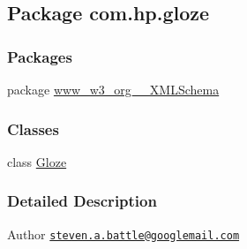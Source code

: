 \hypertarget{namespacecom_1_1hp_1_1gloze}{
\subsection{Package com.hp.gloze}
\label{namespacecom_1_1hp_1_1gloze}
}
\subsubsection*{Packages}
\begin{DoxyCompactItemize}
\item 
package \hyperlink{namespacecom_1_1hp_1_1gloze_1_1www__w3__org__2001___x_m_l_schema}{www\_\-w3\_\-org\_\_\-XMLSchema}
\end{DoxyCompactItemize}
\subsubsection*{Classes}
\begin{DoxyCompactItemize}
\item 
class \hyperlink{classcom_1_1hp_1_1gloze_1_1_gloze}{Gloze}
\end{DoxyCompactItemize}


\subsubsection{Detailed Description}
\begin{DoxyAuthor}{Author}
\href{mailto:steven.a.battle@googlemail.com}{\tt steven.a.battle@googlemail.com} 
\end{DoxyAuthor}
